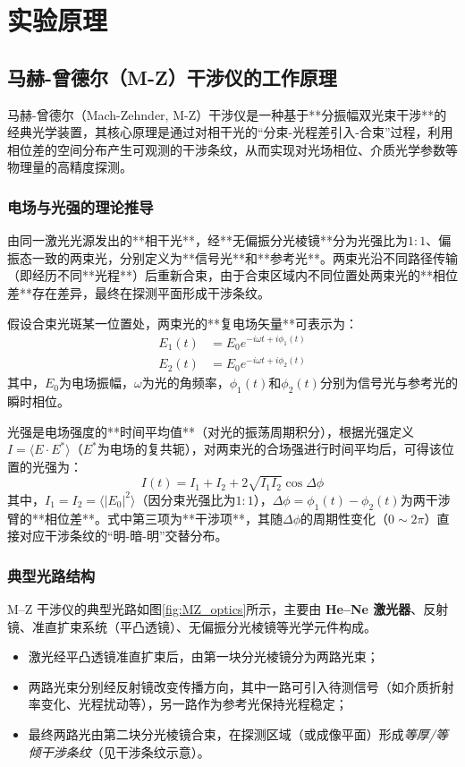 \documentclass[11pt]{article}
\renewcommand{\emph}[1]{\textit{#1}}
\begin{document}
\section{实验原理}
\subsection{马赫-曾德尔（M-Z）干涉仪的工作原理}

马赫-曾德尔（Mach-Zehnder, M-Z）干涉仪是一种基于**分振幅双光束干涉**的经典光学装置，其核心原理是通过对相干光的“分束-光程差引入-合束”过程，利用相位差的空间分布产生可观测的干涉条纹，从而实现对光场相位、介质光学参数等物理量的高精度探测。


\subsubsection{电场与光强的理论推导}
由同一激光光源发出的**相干光**，经**无偏振分光棱镜**分为光强比为$1:1$、偏振态一致的两束光，分别定义为**信号光**和**参考光**。两束光沿不同路径传输（即经历不同**光程**）后重新合束，由于合束区域内不同位置处两束光的**相位差**存在差异，最终在探测平面形成干涉条纹。

假设合束光斑某一位置处，两束光的**复电场矢量**可表示为：
\begin{align}
E_1(t) &= E_0 e^{-i\omega t + i\phi_1(t)} \\
E_2(t) &= E_0 e^{-i\omega t + i\phi_2(t)}
\end{align}
其中，$E_0$为电场振幅，$\omega$为光的角频率，$\phi_1(t)$和$\phi_2(t)$分别为信号光与参考光的瞬时相位。

光强是电场强度的**时间平均值**（对光的振荡周期积分），根据光强定义$I = \langle E \cdot E^* \rangle$（$E^*$为电场的复共轭），对两束光的合场强进行时间平均后，可得该位置的光强为：
\begin{equation}
I(t) = I_1 + I_2 + 2\sqrt{I_1 I_2} \cos\Delta\phi
\end{equation}
其中，$I_1 = I_2 = \langle |E_0|^2 \rangle$（因分束光强比为$1:1$），$\Delta\phi = \phi_1(t) - \phi_2(t)$为两干涉臂的**相位差**。式中第三项为**干涉项**，其随$\Delta\phi$的周期性变化（$0 \sim 2\pi$）直接对应干涉条纹的“明-暗-明”交替分布。


\subsubsection{典型光路结构}
M--Z 干涉仪的典型光路如图\ref{fig:MZ_optics}所示，主要由 \textbf{He--Ne 激光器}、反射镜、准直扩束系统（平凸透镜）、无偏振分光棱镜等光学元件构成。
\begin{itemize}
  \item 激光经平凸透镜准直扩束后，由第一块分光棱镜分为两路光束；
  \item 两路光束分别经反射镜改变传播方向，其中一路可引入待测信号（如介质折射率变化、光程扰动等），另一路作为参考光保持光程稳定；
  \item 最终两路光由第二块分光棱镜合束，在探测区域（或成像平面）形成\emph{等厚/等倾干涉条纹}（见干涉条纹示意）。
\end{itemize}
\end{document}
